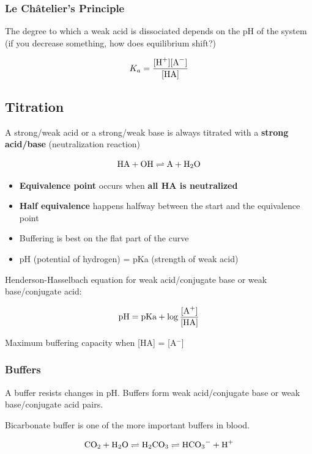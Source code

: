 \documentclass[letterpaper, 12pt]{article}
\begin{document}
\subsubsection*{Le Châtelier's Principle}

The degree to which a weak acid is dissociated depends on the pH of the system (if you decrease something, how does equilibrium shift?)

\begin{equation}
K_a = \frac{[\ce{H+}] [\ce{A-}]} {[\ce{HA}]}
\end{equation}

\subsection*{Titration}

A strong/weak acid or a strong/weak base is always titrated with a \textbf{strong acid/base} (neutralization reaction)

$$ \ce{HA} + \ce{OH} \rightleftharpoons \ce{A} + \ce{H2O} $$

\begin{itemize}
\item \textbf{Equivalence point} occurs when \textbf{all HA is neutralized}

\item \textbf{Half equivalence} happens halfway between the start and the equivalence point

\item Buffering is best on the flat part of the curve

\item pH (potential of hydrogen) = pKa (strength of weak acid)

\end{itemize}

Henderson-Hasselbach equation for weak acid/conjugate base or weak base/conjugate acid:

\begin{equation}
\text{pH} = \text{pKa} + \log \frac{[\ce{A+}]}{[\ce{HA}]}
\end{equation}

Maximum buffering capacity when [HA] = [A$^-$]

\subsubsection*{Buffers}
A buffer resists changes in pH. Buffers form weak acid/conjugate base or weak base/conjugate acid pairs.

Bicarbonate buffer is one of the more important buffers in blood.

$$\ce{CO2} + \ce{H2O} \rightleftharpoons \ce{H2CO3} \rightleftharpoons \ce{HCO3-} + \ce{H+}$$
\end{document}
